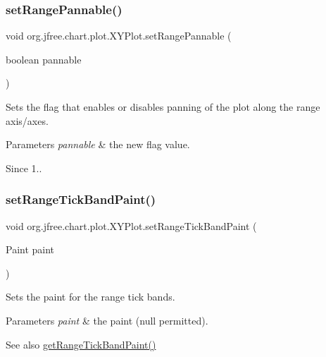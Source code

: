 \subsubsection{\texorpdfstring{set\+Range\+Pannable()}{setRangePannable()}}
{\footnotesize\ttfamily void org.\+jfree.\+chart.\+plot.\+X\+Y\+Plot.\+set\+Range\+Pannable (\begin{DoxyParamCaption}\item[{boolean}]{pannable }\end{DoxyParamCaption})}

Sets the flag that enables or disables panning of the plot along the range axis/axes.


\begin{DoxyParams}{Parameters}
{\em pannable} & the new flag value.\\
\hline
\end{DoxyParams}
\begin{DoxySince}{Since}
1.. 
\end{DoxySince}
\mbox{\label{classorg_1_1jfree_1_1chart_1_1plot_1_1_x_y_plot_a83d3ff283ef61b61af7cd9669194f8e7}} 
\subsubsection{\texorpdfstring{set\+Range\+Tick\+Band\+Paint()}{setRangeTickBandPaint()}}
{\footnotesize\ttfamily void org.\+jfree.\+chart.\+plot.\+X\+Y\+Plot.\+set\+Range\+Tick\+Band\+Paint (\begin{DoxyParamCaption}\item[{Paint}]{paint }\end{DoxyParamCaption})}

Sets the paint for the range tick bands.


\begin{DoxyParams}{Parameters}
{\em paint} & the paint ({\ttfamily null} permitted).\\
\hline
\end{DoxyParams}
\begin{DoxySeeAlso}{See also}
\mbox{\hyperlink{classorg_1_1jfree_1_1chart_1_1plot_1_1_x_y_plot_a38f62f0996960915c78769ff45e6b848}{get\+Range\+Tick\+Band\+Paint()}} 
\end{DoxySeeAlso}
\mbox{\label{classorg_1_1jfree_1_1chart_1_1plot_1_1_x_y_plot_a0f5bd5185f2a8171cf30473aa89fe1b7}} 
